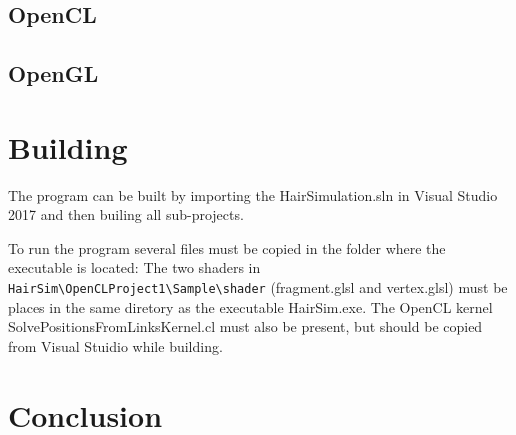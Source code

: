 \documentclass[11pt,a4paper]{scrartcl}
\begin{document}
\subsection{OpenCL}

\subsection{OpenGL}


\section{Building}
The program can be built by importing the HairSimulation.sln in Visual Studio 2017 and then builing all sub-projects.

To run the program several files must be copied in the folder where the executable is located: The two shaders in \verb|HairSim\OpenCLProject1\Sample\shader| (fragment.glsl and vertex.glsl) must be places in the same diretory as the executable HairSim.exe. The OpenCL kernel SolvePositionsFromLinksKernel.cl must also be present, but should be copied from Visual Stuidio while building.


\section{Conclusion}
\end{document}
